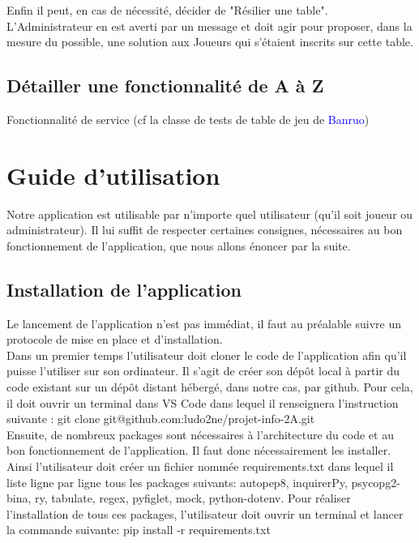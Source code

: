 \documentclass[11pt]{article}
\begin{document}
Enfin il peut, en cas de nécessité, décider de "Résilier une table". L'Administrateur en est averti par un message et doit agir pour proposer, dans la mesure du possible, une solution aux Joueurs qui s'étaient inscrits sur cette table.\\


\subsection{Détailler une fonctionnalité de A à Z}
Fonctionnalité de service (cf la classe de tests de table de jeu de \textcolor{blue}{Banruo})






\newpage
\section{Guide d'utilisation}

Notre application est utilisable par n'importe quel utilisateur (qu’il soit joueur ou administrateur). Il lui suffit de respecter certaines consignes, nécessaires au bon fonctionnement de l’application, que nous allons énoncer par la suite. 

\subsection{Installation de l'application}
Le lancement de l'application n'est pas immédiat, il faut au préalable suivre un protocole de mise en place et d’installation. \\

Dans un premier temps l’utilisateur doit cloner le code de l’application afin qu’il puisse l’utiliser sur son ordinateur. Il s’agit de créer son dépôt local à partir du code existant sur un dépôt distant hébergé, dans notre cas, par github.
Pour cela, il doit ouvrir un terminal dans VS Code dans lequel il renseignera l’instruction suivante : git clone git@github.com:ludo2ne/projet-info-2A.git \\

Ensuite, de nombreux packages sont nécessaires à l’architecture du code et au bon fonctionnement de l’application. Il faut donc nécessairement les installer. Ainsi l'utilisateur doit créer un fichier nommée requirements.txt dans lequel il liste ligne par ligne tous les packages suivants: autopep8, inquirerPy, psycopg2-bina, ry, tabulate, regex, pyfiglet, mock, python-dotenv. Pour réaliser l’installation de tous ces packages, l’utilisateur doit ouvrir un terminal et lancer la commande suivante: pip install -r requirements.txt \\
\end{document}

